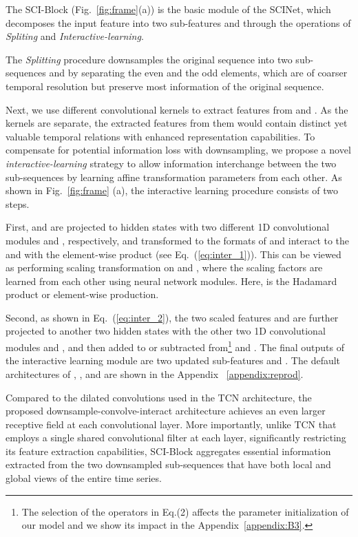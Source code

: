 \documentclass{article}
\begin{document}
The SCI-Block (Fig.~\ref{fig:frame}(a)) is the basic module of the SCINet, which decomposes the input feature  into two sub-features  and  through the operations of \emph{Spliting} and \emph{Interactive-learning}. 


The \textit{Splitting} procedure downsamples the original sequence  into two sub-sequences  and  by separating the even and the odd elements, which are of coarser temporal resolution but preserve most information of the original sequence.

Next, we use different convolutional kernels to extract features from  and . As the kernels are separate, the extracted features from them would contain distinct yet valuable temporal relations with enhanced representation capabilities.
To compensate for potential information loss with downsampling, 
we propose a novel \emph{interactive-learning} strategy to allow information interchange between the two sub-sequences by learning affine transformation parameters from each other. 
As shown in Fig.~\ref{fig:frame} (a), the interactive learning procedure consists of two steps. 


First,  and  are projected to hidden states with two different 1D convolutional modules  and , respectively, and transformed to the formats of  and interact to the  and  with the element-wise product (see Eq.~(\ref{eq:inter_1})). 
This can be viewed as performing scaling transformation on  and , where the scaling factors are learned from each other using neural network modules.
Here,  is the Hadamard product or element-wise production.

\vspace{-10pt}

\vspace{-10pt}



Second, as shown in Eq.~(\ref{eq:inter_2}), the two scaled features  and  are further projected to another two hidden states with the other two 1D convolutional modules  and , and then added to or subtracted from\footnote{The selection of the operators in Eq.(2) affects the parameter initialization of our model and we show its impact in the Appendix~\ref{appendix:B3}.}  and .
The final outputs of the interactive learning module are two updated sub-features  and . The default architectures of , ,  and  are shown in the Appendix ~\ref{appendix:reprod}. 

Compared to the dilated convolutions used in the TCN architecture, the proposed downsample-convolve-interact architecture achieves an even larger receptive field at each convolutional layer. More importantly, unlike TCN that employs a single shared convolutional filter at each layer, significantly restricting its feature extraction capabilities, SCI-Block aggregates essential information extracted from the two downsampled sub-sequences that have both local and global views of the entire time series.
\end{document}
